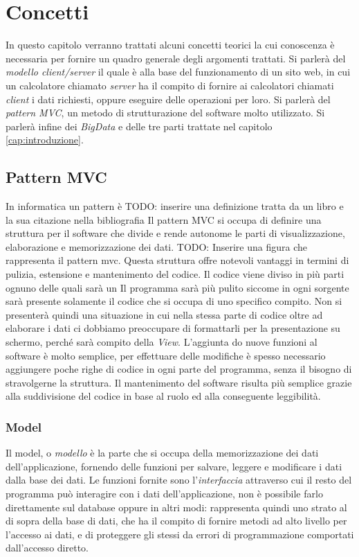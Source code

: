 \chapter{Concetti}%
In questo capitolo verranno trattati alcuni concetti teorici la cui conoscenza è necessaria per fornire un quadro generale degli argomenti trattati. Si parlerà del \emph{modello client/server} il quale è alla base del funzionamento di un sito web, in cui un calcolatore chiamato \emph{server} ha il compito di fornire ai calcolatori chiamati \emph{client} i dati richiesti, oppure eseguire delle operazioni per loro. Si parlerà del \emph{pattern MVC}, un metodo di strutturazione del software molto utilizzato. Si parlerà infine dei \emph{BigData} e delle tre parti trattate nel capitolo~ \ref{cap:introduzione}.



\section{Pattern MVC}
In informatica un pattern è TODO: inserire una definizione tratta da un libro e la sua citazione nella bibliografia
Il pattern MVC si occupa di definire una struttura per il software che divide e rende autonome le parti di visualizzazione, elaborazione e memorizzazione dei dati.
TODO: Inserire una figura che rappresenta il pattern mvc.
Questa struttura offre notevoli vantaggi in termini di pulizia, estensione e mantenimento del codice. Il codice viene diviso in più parti ognuno delle quali sarà un Il programma sarà più pulito siccome in ogni sorgente sarà presente solamente il codice che si occupa di uno specifico compito. Non si presenterà quindi una situazione in cui nella stessa parte di codice oltre ad elaborare i dati ci dobbiamo preoccupare di formattarli per la presentazione su schermo, perché sarà compito della \emph{View}. L'aggiunta do nuove funzioni al software è molto semplice, per effettuare delle modifiche è spesso necessario aggiungere poche righe di codice in ogni parte del programma, senza il bisogno di stravolgerne la struttura. Il mantenimento del software risulta più semplice grazie alla suddivisione del codice in base al ruolo ed alla conseguente leggibilità.


\subsection{Model}
Il model, o \emph{modello} è la parte che si occupa della memorizzazione dei dati dell'applicazione, fornendo delle funzioni per salvare, leggere e modificare i dati dalla base dei dati. Le funzioni fornite sono l'\emph{interfaccia} attraverso cui il resto del programma può interagire con i dati dell'applicazione, non è possibile farlo direttamente sul database oppure in altri modi: rappresenta quindi uno strato al di sopra della base di dati, che ha il compito di fornire metodi ad alto livello per l'accesso ai dati, e di proteggere gli stessi da errori di programmazione comportati dall'accesso diretto.


